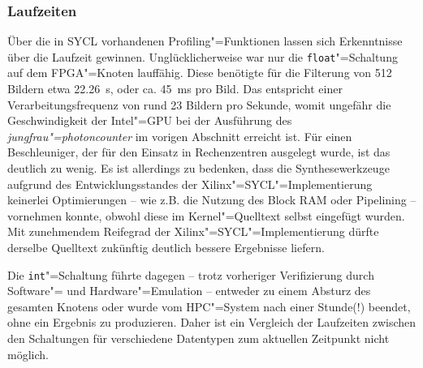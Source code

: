 \subsubsection{Laufzeiten}

Über die in SYCL vorhandenen Profiling"=Funktionen lassen sich Erkenntnisse über
die Laufzeit gewinnen. Unglücklicherweise war nur die \texttt{float}"=Schaltung
auf dem FPGA"=Knoten lauffähig. Diese benötigte für die Filterung von
512 Bildern etwa \SI{22.26}{\second}, oder ca. \SI{45}{\milli\second} pro Bild.
Das entspricht einer Verarbeitungsfrequenz von rund 23 Bildern pro Sekunde,
womit ungefähr die Geschwindigkeit der Intel"=GPU bei der Ausführung des
\textit{jungfrau"=photoncounter} im vorigen Abschnitt erreicht ist. Für einen
Beschleuniger, der für den Einsatz in Rechenzentren ausgelegt wurde, ist das
deutlich zu wenig. Es ist allerdings zu bedenken, dass die Synthesewerkzeuge
aufgrund des Entwicklungsstandes der Xilinx"=SYCL"=Implementierung keinerlei
Optimierungen -- wie z.B. die Nutzung des Block RAM oder Pipelining -- vornehmen
konnte, obwohl diese im Kernel"=Quelltext selbst eingefügt wurden. Mit
zunehmendem Reifegrad der Xilinx"=SYCL"=Implementierung dürfte derselbe
Quelltext zukünftig deutlich bessere Ergebnisse liefern.

Die \texttt{int}"=Schaltung führte dagegen -- trotz vorheriger Verifizierung
durch Software"= und Hardware"=Emulation -- entweder zu einem Absturz des
gesamten Knotens oder wurde vom HPC"=System nach einer Stunde(!) beendet, ohne
ein Ergebnis zu produzieren. Daher ist ein Vergleich der Laufzeiten zwischen
den Schaltungen für verschiedene Datentypen zum aktuellen Zeitpunkt nicht
möglich.
